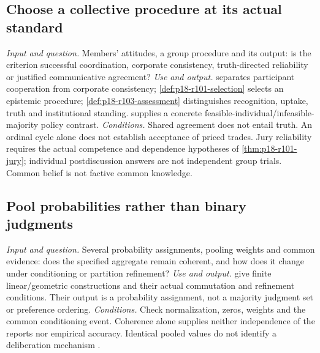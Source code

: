 \subsection{Choose a collective procedure at its actual standard}
\label{sec:p14-finder-collective-standards}
\textit{Input and question.} Members' attitudes, a group procedure and its
output: is the criterion successful coordination, corporate consistency,
truth-directed reliability or justified communicative agreement?
\textit{Use and output.}  separates
participant cooperation from corporate consistency;
\cref{def:p18-r101-selection} selects an epistemic procedure;
\cref{def:p18-r103-assessment} distinguishes recognition, uptake, truth
and institutional standing.  supplies a
concrete feasible-individual/infeasible-majority policy contrast.
\textit{Conditions.} Shared agreement does not entail truth. An ordinal
cycle alone does not establish acceptance of priced trades. Jury reliability
requires the actual competence and dependence hypotheses of
\cref{thm:p18-r101-jury}; individual postdiscussion answers are not
independent group trials. Common belief is not factive common knowledge.

\subsection{Pool probabilities rather than binary judgments}
\label{sec:p14-finder-opinion-pooling}
\textit{Input and question.} Several probability assignments, pooling
weights and common evidence: does the specified aggregate remain coherent,
and how does it change under conditioning or partition refinement?
\textit{Use and output.} 
give finite linear/geometric constructions and their actual commutation
and refinement conditions. Their output is a probability assignment,
not a majority judgment set or preference ordering.
\textit{Conditions.} Check normalization, zeros, weights and the common
conditioning event. Coherence alone supplies neither independence of
the reports nor empirical accuracy. Identical pooled values do not identify
a deliberation mechanism \cite{DietrichSpiekermann2021Social}.

